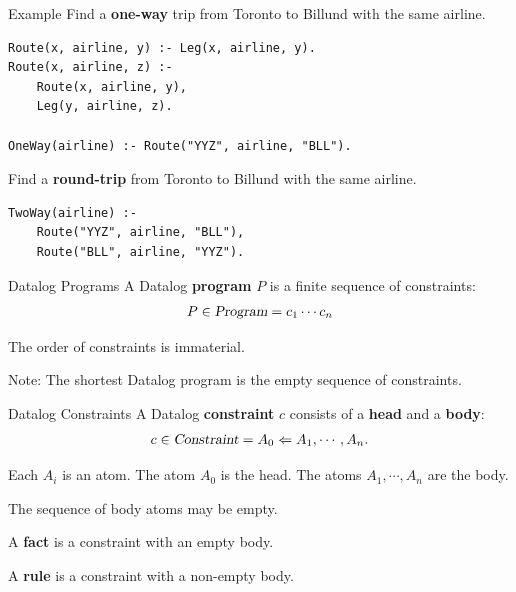 \begin{frame}[fragile]{Example}
Find a \textbf{one-way} trip from Toronto to Billund with the same airline.

\begin{lstlisting}[language=flix, xleftmargin=0.8cm]
Route(x, airline, y) :- Leg(x, airline, y).
Route(x, airline, z) :- 
    Route(x, airline, y),
    Leg(y, airline, z).

OneWay(airline) :- Route("YYZ", airline, "BLL").
\end{lstlisting}

\pause

Find a \textbf{round-trip} from Toronto to Billund with the same airline.

\begin{lstlisting}[language=flix, xleftmargin=0.8cm]
TwoWay(airline) :- 
    Route("YYZ", airline, "BLL"), 
    Route("BLL", airline, "YYZ").
\end{lstlisting}
\end{frame}

\begin{frame}{Datalog Programs}
A Datalog \textbf{program} $P$ is a finite sequence of constraints:
%
{\Large
\begin{align*}
P \in \textsl{Program} = c_1 \cdots c_n
\end{align*}
}

\pause

The order of constraints is immaterial.

\pause

Note: The shortest Datalog program is the empty sequence of constraints.
\end{frame}

\begin{frame}{Datalog Constraints}
A Datalog \textbf{constraint} $c$ consists of a \textbf{head} and a \textbf{body}:
%
{\Large
\begin{align*}
c \in \textsl{Constraint} = A_0 \Leftarrow A_1, \cdots, A_n.
\end{align*}
}

\pause

Each $A_i$ is an atom. The atom $A_0$ is the head. The atoms $A_1, \cdots, A_n$ are the body. 

\pause

The sequence of body atoms may be empty.

\pause

A \textbf{fact} is a constraint with an empty body.

A \textbf{rule} is a constraint with a non-empty body.
\end{frame}

